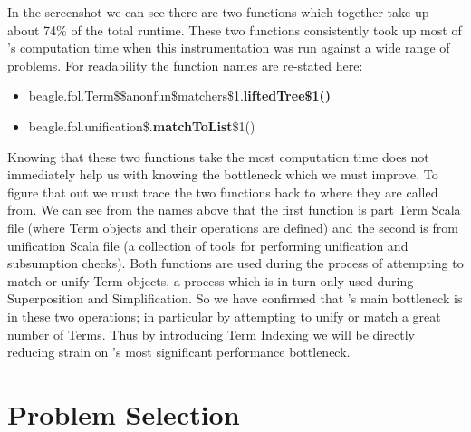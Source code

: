 In the screenshot we can see there are two functions which together take up about
74\% of the total runtime. These two functions consistently took up most of \beagle's
computation time when this instrumentation was run against a wide range of problems.
For readability the function names are re-stated here:
\begin{itemize}
\item[]beagle.fol.Term\$\$anonfun\$matchers\$1.\textbf{liftedTree\$1()}
\item[]beagle.fol.unification\$.\textbf{matchToList}\$1()
\end{itemize}
Knowing that these two functions take the most computation time does not immediately
help us with knowing the bottleneck which we must improve. To figure that out we must
trace the two functions back to where they are called from. We can see from the
names above that the first function is part Term Scala file (where Term objects and their
operations are defined) and the second is from unification Scala file (a collection
of tools for performing unification and subsumption checks). Both functions are
used during the process of attempting to match or unify Term objects, a process
which is in turn only used during Superposition and Simplification. So we have confirmed
that \beagle's main bottleneck is in these two operations; in particular by attempting
to unify or match a great number of Terms. Thus by introducing Term Indexing we will
be directly reducing strain on \beagle's most significant performance bottleneck.

\section{Problem Selection}
\label{sec:problems}


